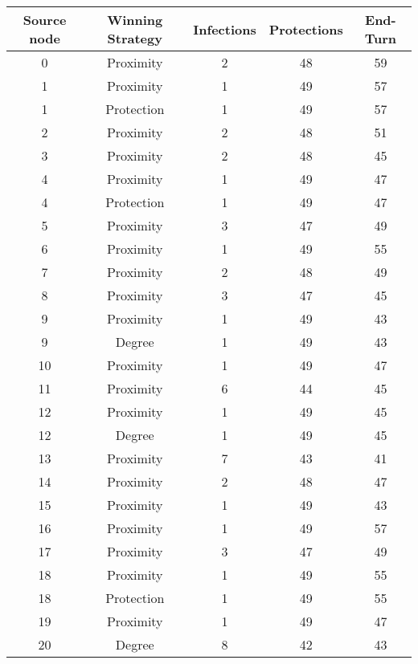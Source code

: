 \documentclass[results.tex]{subfiles}
\begin{document}
\begin{center}
  \begin{tabular}{| c || c | c | c | c |}
    \hline
    {\bfseries Source node} & {\bfseries Winning Strategy} & {\bfseries Infections} & {\bfseries Protections} & {\bfseries End-Turn} \\  %
    \hline\hline
    0 & Proximity & 2 & 48 & 59 \\ 
    \hline
    1 & Proximity & 1 & 49 & 57 \\ 
    \hline
    1 & Protection & 1 & 49 & 57 \\ 
    \hline
    2 & Proximity & 2 & 48 & 51 \\ 
    \hline
    3 & Proximity & 2 & 48 & 45 \\ 
    \hline
    4 & Proximity & 1 & 49 & 47 \\ 
    \hline
    4 & Protection & 1 & 49 & 47 \\ 
    \hline
    5 & Proximity & 3 & 47 & 49 \\ 
    \hline
    6 & Proximity & 1 & 49 & 55 \\ 
    \hline
    7 & Proximity & 2 & 48 & 49 \\ 
    \hline
    8 & Proximity & 3 & 47 & 45 \\ 
    \hline
    9 & Proximity & 1 & 49 & 43 \\ 
    \hline
    9 & Degree & 1 & 49 & 43 \\ 
    \hline
    10 & Proximity & 1 & 49 & 47 \\ 
    \hline
    11 & Proximity & 6 & 44 & 45 \\ 
    \hline
    12 & Proximity & 1 & 49 & 45 \\ 
    \hline
    12 & Degree & 1 & 49 & 45 \\ 
    \hline
    13 & Proximity & 7 & 43 & 41 \\ 
    \hline
    14 & Proximity & 2 & 48 & 47 \\ 
    \hline
    15 & Proximity & 1 & 49 & 43 \\ 
    \hline
    16 & Proximity & 1 & 49 & 57 \\ 
    \hline
    17 & Proximity & 3 & 47 & 49 \\ 
    \hline
    18 & Proximity & 1 & 49 & 55 \\ 
    \hline
    18 & Protection & 1 & 49 & 55 \\ 
    \hline
    19 & Proximity & 1 & 49 & 47 \\ 
    \hline
    20 & Degree & 8 & 42 & 43 \\ 

\end{tabular}
\end{center}
\end{document}
